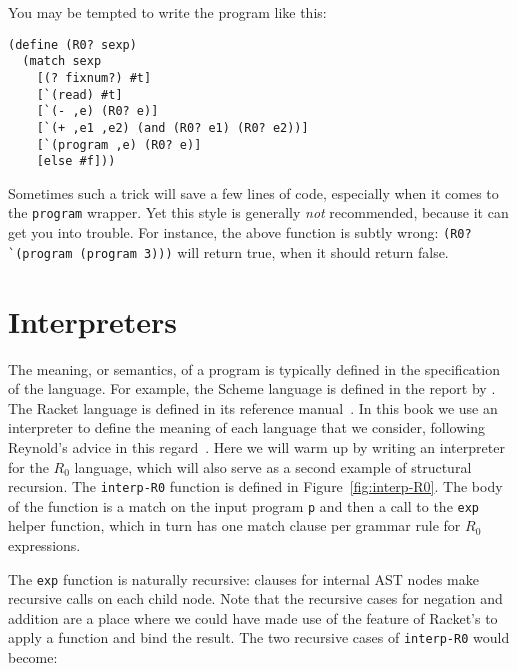 \documentclass[11pt]{book}
\begin{document}
You may be tempted to write the program like this:
\begin{center}
\begin{minipage}{0.5\textwidth}
\begin{lstlisting}
(define (R0? sexp)
  (match sexp
    [(? fixnum?) #t]
    [`(read) #t]
    [`(- ,e) (R0? e)]
    [`(+ ,e1 ,e2) (and (R0? e1) (R0? e2))]
    [`(program ,e) (R0? e)]
    [else #f]))
\end{lstlisting}
\end{minipage}
\end{center}
%
Sometimes such a trick will save a few lines of code, especially when it comes
to the {\tt program} wrapper.  Yet this style is generally \emph{not}
recommended, because it can get you into trouble.
%
For instance, the above function is subtly wrong:
\lstinline{(R0? `(program (program 3)))} will return true, when it
should return false.



\section{Interpreters}
\label{sec:interp-R0}

The meaning, or semantics, of a program is typically defined in the
specification of the language. For example, the Scheme language is
defined in the report by \cite{SPERBER:2009aa}. The Racket language is
defined in its reference manual~\citep{plt-tr}. In this book we use an
interpreter to define the meaning of each language that we consider,
following Reynold's advice in this
regard~\citep{reynolds72:_def_interp}. Here we will warm up by writing
an interpreter for the $R_0$ language, which will also serve as a
second example of structural recursion. The \texttt{interp-R0}
function is defined in Figure~\ref{fig:interp-R0}. The body of the
function is a match on the input program \texttt{p} and
then a call to the \lstinline{exp} helper function, which in turn has
one match clause per grammar rule for $R_0$ expressions.

The \lstinline{exp} function is naturally recursive: clauses for internal AST
nodes make recursive calls on each child node.  Note that the recursive cases
for negation and addition are a place where we could have made use of the
 feature of Racket's  to apply a function and bind the
result.  The two recursive cases of \lstinline{interp-R0} would become:
\end{document}
